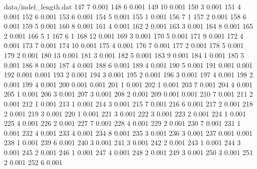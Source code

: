 \begin{filecontents}{data/indel_length.dat}
147	7	0.001
148	6	0.001
149	10	0.001
150	3	0.001
151	4	0.001
152	6	0.001
153	6	0.001
154	5	0.001
155	1	0.001
156	7	1
157	2	0.001
158	6	0.001
159	5	0.001
160	8	0.001
161	4	0.001
162	2	0.001
163	3	0.001
164	8	0.001
165	2	0.001
166	5	1
167	6	1
168	12	0.001
169	3	0.001
170	5	0.001
171	9	0.001
172	4	0.001
173	7	0.001
174	10	0.001
175	4	0.001
176	7	0.001
177	2	0.001
178	5	0.001
179	2	0.001
180	13	0.001
181	3	0.001
182	5	0.001
183	9	0.001
184	1	0.001
185	5	0.001
186	8	0.001
187	4	0.001
188	6	0.001
189	4	0.001
190	5	0.001
191	0.001	0.001
192	0.001	0.001
193	2	0.001
194	3	0.001
195	2	0.001
196	3	0.001
197	4	0.001
198	2	0.001
199	4	0.001
200	0.001	0.001
201	1	0.001
202	1	0.001
203	7	0.001
204	4	0.001
205	1	0.001
206	3	0.001
207	3	0.001
208	2	0.001
209	0.001	0.001
210	7	0.001
211	2	0.001
212	1	0.001
213	1	0.001
214	3	0.001
215	7	0.001
216	6	0.001
217	2	0.001
218	2	0.001
219	3	0.001
220	1	0.001
221	3	0.001
222	3	0.001
223	2	0.001
224	1	0.001
225	4	0.001
226	2	0.001
227	7	0.001
228	4	0.001
229	2	0.001
230	7	0.001
231	1	0.001
232	4	0.001
233	4	0.001
234	8	0.001
235	3	0.001
236	3	0.001
237	0.001	0.001
238	1	0.001
239	6	0.001
240	3	0.001
241	3	0.001
242	2	0.001
243	1	0.001
244	3	0.001
245	2	0.001
246	1	0.001
247	4	0.001
248	2	0.001
249	3	0.001
250	3	0.001
251	2	0.001
252	6	0.001

\end{filecontents}

